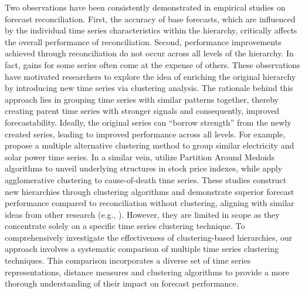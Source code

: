 \documentclass[a4paper,review,12pt,authoryear]{elsarticle}
\begin{document}
Two observations have been consistently demonstrated in empirical studies on forecast reconciliation. First, the accuracy of base forecasts, which are influenced by the individual time series characteristics within the hierarchy, critically affects the overall performance of reconciliation.  Second, performance improvements achieved through reconciliation do not occur across all levels of the hierarchy. In fact, gains for some series often come at the expense of others.
These observations have motivated researchers to explore the idea of enriching the original hierarchy by introducing new time series via clustering analysis.
The rationale behind this approach lies in grouping time series with similar patterns together, thereby creating parent time series with stronger signals and consequently, improved forecastability. Ideally, the original series can ``borrow strength'' from the newly created series, leading to improved performance across all levels. For example, \cite{pangHierarchicalElectricityTime2022} propose a multiple alternative clustering method to group similar electricity and solar power time series.  In a similar vein, \cite{matteraImprovingOutofSampleForecasts2023} utilize Partition Around Medoids algorithms to unveil underlying structures in stock price indexes, while \cite{liForecastReconciliationApproach2019} apply agglomerative clustering to cause-of-death time series. These studies construct new hierarchies through clustering algorithms and demonstrate superior forecast performance compared to reconciliation without clustering, aligning with similar ideas from other research (e.g., \citealp{huberClusterbasedHierarchicalDemand2017, pangHierarchicalElectricityTime2018}). 
However, they are limited in scope as they concentrate solely on a specific time series clustering technique. To comprehensively investigate the effectiveness of clustering-based hierarchies, our approach involves a systematic comparison of multiple time series clustering techniques. This comparison incorporates a diverse set of time series representations, distance measures and clustering algorithms to provide a more thorough understanding of their impact on forecast performance.
\end{document}
